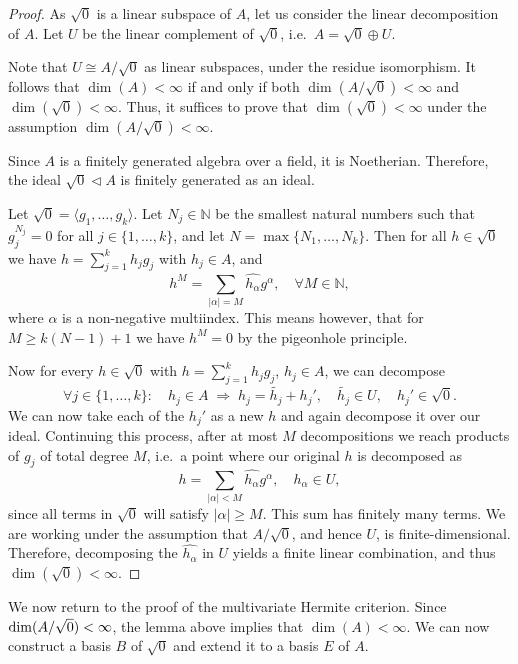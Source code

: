 \documentclass{amsart}
\begin{document}
\begin{proof}
As $\sqrt{0}$ is a linear subspace of $A$, let us consider the linear decomposition of $A$. Let $U$ be the linear complement of $\sqrt{0}$, i.e.~$A = \sqrt{0} \oplus U$. 

Note that $U \cong A/\sqrt{0}$ as linear subspaces, under the residue isomorphism. It follows that $\dim(A) < \infty$ if and only if both $\dim(A/\sqrt{0}) < \infty$ and $\dim(\sqrt{0}) < \infty$. Thus, it suffices to prove that $\dim(\sqrt{0}) < \infty$ under the assumption $\dim(A/\sqrt{0}) < \infty$.

Since $A$ is a finitely generated algebra over a field, it is Noetherian. Therefore, the ideal $\sqrt{0} \triangleleft A$ is finitely generated as an ideal.

Let $\sqrt{0} = \langle g_1, \ldots, g_k\rangle$. Let $N_j \in \mathbb{N}$ be the smallest natural numbers such that $g_j^{N_j} = 0$ for all $j \in \{1, \ldots, k\}$, and let $N = \max\{N_1, \ldots, N_k\}$. Then for all $h \in \sqrt{0}$ we have $h = \sum_{j=1}^k h_j g_j$ with $h_j \in A$, and
\[
h^M = \sum_{|\alpha|=M} \widehat{h_\alpha} g^\alpha, \quad \forall M \in \mathbb{N},
\]
where $\alpha$ is a non-negative multiindex. This means however, that for $M \geq k(N-1)+1$ we have $h^M = 0$ by the pigeonhole principle.

Now for every $h \in \sqrt{0}$ with $h = \sum_{j=1}^k h_j g_j$, $h_j \in A$, we can decompose
\[
\forall j \in \{1, \ldots, k\}: \quad h_j \in A \;\Rightarrow\; h_j = \widetilde{h_j} + h_j', \quad
\widetilde{h_j} \in U, \quad h_j' \in \sqrt{0}.
\]
We can now take each of the $h_j'$ as a new $h$ and again decompose it over our ideal. Continuing this process, after at most $M$ decompositions we reach products of $g_j$ of total degree $M$, i.e.~a point where our original $h$ is decomposed as 
\[
h = \sum_{|\alpha| < M} \widehat{h_\alpha} g^{\alpha}, \quad \widehat{h_\alpha} \in U,
\]
since all terms in $\sqrt{0}$ will satisfy $|\alpha| \geq M$. This sum has finitely many terms. We are working under the assumption that $A/\sqrt{0}$, and hence $U$, is finite-dimensional. Therefore, decomposing the $\widehat{h_\alpha}$ in $U$ yields a finite linear combination, and thus $\dim(\sqrt{0}) < \infty$.
\end{proof}

We now return to the proof of the multivariate Hermite criterion. Since $\linebreak\dim(A/\sqrt{0}) < \infty$, the lemma above implies that $\dim(A) < \infty$. We can now construct a basis $B$ of $\sqrt{0}$ and extend it to a basis $E$ of $A$. 
\end{document}
